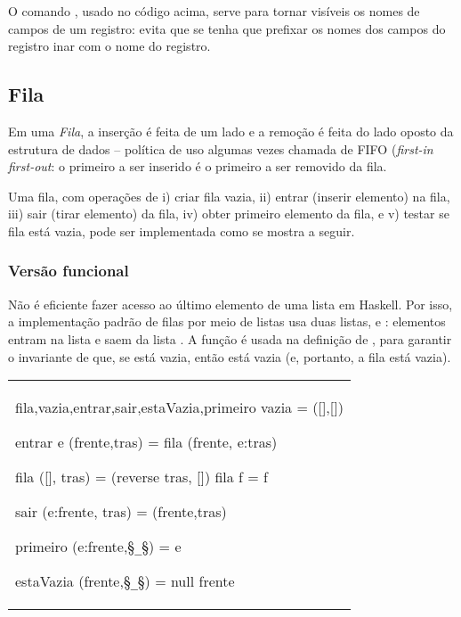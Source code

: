 O comando , usado no código acima, serve para tornar
visíveis os nomes de campos de um registro:  evita que se
tenha que prefixar os nomes dos campos do registro ina{r} com o nome
do registro.


\subsection{Fila}
\label{sec:fila}

Em uma {\em Fila}, a inserção é feita de um lado e a remoção é feita
do lado oposto da estrutura de dados -- política de uso algumas vezes
chamada de FIFO ({\em first-in first-out\/}: o primeiro a ser inserido
é o primeiro a ser removido da fila.

Uma fila, com operações de i) criar fila vazia, ii) entrar (inserir
elemento) na fila, iii) sair (tirar elemento) da fila, iv) obter
primeiro elemento da fila, e v) testar se fila está vazia, pode ser
implementada como se mostra a seguir.

\subsubsection{Versão funcional}

Não é eficiente fazer acesso ao último elemento de uma lista em
Haskell. Por isso, a implementação padrão de filas por meio de listas
usa duas listas,  e : elementos entram na lista
 e saem da lista . A função  é usada
na definição de , para garantir o invariante de que, se
 está vazia, então  está vazia (e, portanto, a
fila está vazia).

\begin{center}
\begin{tabular}{l}
\begin{hask}{fila,vazia,entrar,sair,estaVazia,primeiro}{}
vazia = ([],[])

entrar e (frente,tras) = fila (frente, e:tras)

fila ([], tras) = (reverse tras, [])
fila f          = f

sair (e:frente, tras) = (frente,tras)

primeiro (e:frente,§{\tt\_}§) = e

estaVazia (frente,§{\tt \_}§)  = null frente
\end{hask}
\end{tabular}
\end{center}

